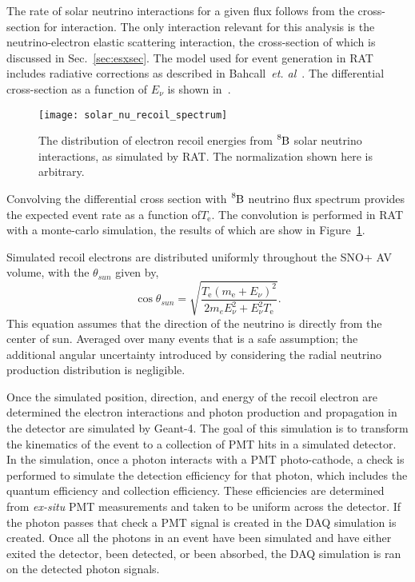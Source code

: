The rate of solar neutrino interactions for a given flux follows from the cross-section for
interaction. The only interaction relevant for this analysis is the
neutrino-electron elastic scattering interaction, the cross-section of which
is discussed in Sec.~\ref{sec:esxsec}.
The model used for event generation in RAT includes radiative corrections as
described in Bahcall~\textit{et. al}~\cite{escrosssec}.
The differential cross-section as a function of $E_{\nu}$ is shown in~\cite{fig:diff_xsec}.

\begin{figure}[htbp]
  \centering
  \texttt{[image: solar\_nu\_recoil\_spectrum]}
  \caption[Solar Recoil Electron Spectrum]{
      The distribution of electron recoil energies from $\ce{^{8}B}$ solar neutrino
      interactions, as simulated by RAT. The normalization shown here is arbitrary.}
    \label{fig:recoil_spectrum}
\end{figure}

Convolving the differential cross section with $\ce{^{8}B}$ neutrino flux
spectrum provides the expected event rate as a function of$T_{\mathrm{e}}$. 
The convolution is performed in RAT with a monte-carlo simulation, the
results of which are show in Figure~\ref{fig:recoil_spectrum}.

Simulated recoil electrons are distributed uniformly throughout the SNO+ AV volume, with
the $\theta_{sun}$ given by,
\begin{equation}
  \cos\theta_{sun} = \sqrt{\dfrac{T_{\mathrm{e}}(m_{\mathrm{e}}+E_{\nu})^{2}}{2m_{e}E_{\nu}^{2} + E_{\nu}^{2}T_{\mathrm{e}}}}\text{.}
  \label{eqn:costheta_te}
\end{equation}
This equation assumes that the direction of the neutrino is directly from the center of sun.
Averaged over many events that is a safe assumption; the additional angular uncertainty
introduced by considering the radial neutrino production distribution is negligible.

Once the simulated position, direction, and energy of the recoil electron are determined  the
electron interactions and  photon production and propagation in the detector are simulated
by Geant-4.
The goal of this simulation is to transform the kinematics of the event to
a collection of PMT hits in a simulated detector.
In the simulation, once a photon interacts with a PMT photo-cathode, a check is performed
to simulate the detection efficiency for that photon, which includes the quantum efficiency and
collection efficiency.
These efficiencies are determined from \textit{ex-situ} PMT measurements and
taken to be uniform across the detector. %
If the photon passes that check a PMT signal is created in the DAQ simulation is created.
Once all the photons in an event have been simulated and have either exited the detector,
been detected, or been absorbed, the DAQ simulation is ran on the detected photon signals.


